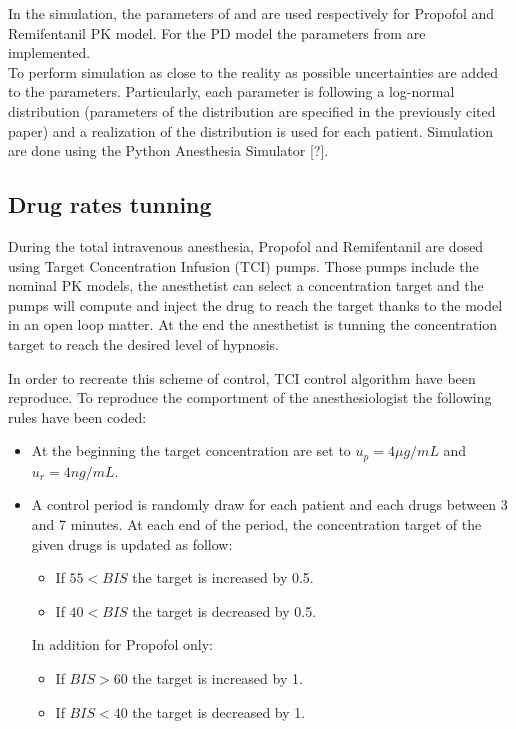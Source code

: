 In the simulation, the parameters of \cite{eleveldPharmacokineticPharmacodynamicModel2018} and \cite{eleveldAllometricModelRemifentanil2017} are used respectively for Propofol and Remifentanil PK model. For the PD model the parameters from \cite{bouillonPharmacodynamicInteractionPropofol2004} are implemented. \\
To perform simulation as close to the reality as possible uncertainties are added to the parameters. Particularly, each parameter is following a log-normal distribution (parameters of the distribution are specified in the previously cited paper) and a realization of the distribution is used for each patient. Simulation are done using the Python Anesthesia Simulator [?].

\subsection{Drug rates tunning}

During the total intravenous anesthesia, Propofol and Remifentanil are dosed using Target Concentration Infusion (TCI) pumps. Those pumps include the nominal PK models, the anesthetist can select a concentration target and the pumps will compute and inject the drug to reach the target thanks to the model in an open loop matter. At the end the anesthetist is tunning the concentration target to reach the desired level of hypnosis.
\medskip


In order to recreate this scheme of control, TCI control algorithm \cite{shaferAlgorithmsRapidlyAchieve1992} have been reproduce. To reproduce the comportment of the anesthesiologist the following rules have been coded:
\begin{itemize}
\item At the beginning the target concentration are set to $u_p = 4 \mu g/mL$ and $u_r = 4 ng/mL$.
\item A control period is randomly draw for each patient and each drugs between 3 and 7 minutes. At each end of the period, the concentration target of the given drugs is updated as follow:
\begin{itemize}
	\item If $55<BIS$ the target is increased by 0.5.
	\item If $40<BIS$ the target is decreased by 0.5.
\end{itemize}
In addition for Propofol only:
\begin{itemize}
	\item If $BIS>60$ the target is increased by 1.
	\item If $BIS<40$ the target is decreased by 1.
\end{itemize}
\end{itemize}

